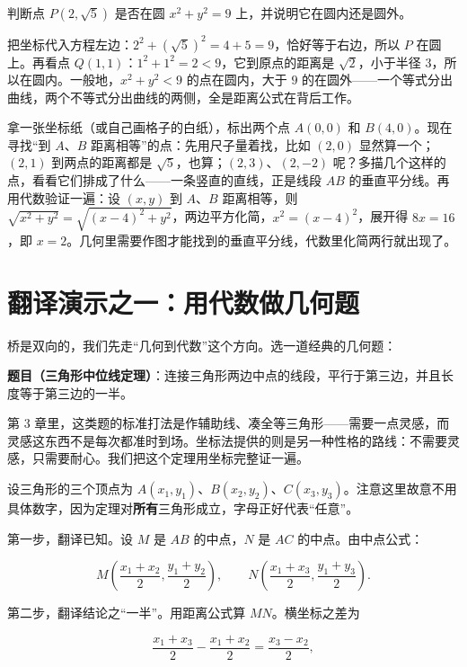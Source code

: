 \begin{li}
判断点 $P(2,\sqrt{5})$ 是否在圆 $x^{2}+y^{2}=9$ 上，并说明它在圆内还是圆外。

把坐标代入方程左边：$2^{2}+(\sqrt{5})^{2}=4+5=9$，恰好等于右边，所以 $P$ 在圆上。再看点 $Q(1,1)$：$1^{2}+1^{2}=2<9$，它到原点的距离是 $\sqrt{2}$，小于半径 $3$，所以在圆内。一般地，$x^{2}+y^{2}<9$ 的点在圆内，大于 $9$ 的在圆外——一个等式分出曲线，两个不等式分出曲线的两侧，全是距离公式在背后工作。
\end{li}

\begin{shiyan}
拿一张坐标纸（或自己画格子的白纸），标出两个点 $A(0,0)$ 和 $B(4,0)$。现在寻找“到 $A$、$B$ 距离相等”的点：先用尺子量着找，比如 $(2,0)$ 显然算一个；$(2,1)$ 到两点的距离都是 $\sqrt{5}$，也算；$(2,3)$、$(2,-2)$ 呢？多描几个这样的点，看看它们排成了什么——一条竖直的直线，正是线段 $AB$ 的垂直平分线。再用代数验证一遍：设 $(x,y)$ 到 $A$、$B$ 距离相等，则 $\sqrt{x^{2}+y^{2}}=\sqrt{(x-4)^{2}+y^{2}}$，两边平方化简，$x^{2}=(x-4)^{2}$，展开得 $8x=16$，即 $x=2$。几何里需要作图才能找到的垂直平分线，代数里化简两行就出现了。
\end{shiyan}

\section{翻译演示之一：用代数做几何题}

桥是双向的，我们先走“几何到代数”这个方向。选一道经典的几何题：

\textbf{题目（三角形中位线定理）}：连接三角形两边中点的线段，平行于第三边，并且长度等于第三边的一半。

第 3 章里，这类题的标准打法是作辅助线、凑全等三角形——需要一点灵感，而灵感这东西不是每次都准时到场。坐标法提供的则是另一种性格的路线：不需要灵感，只需要耐心。我们把这个定理用坐标完整证一遍。

设三角形的三个顶点为 $A(x_{1},y_{1})$、$B(x_{2},y_{2})$、$C(x_{3},y_{3})$。注意这里故意不用具体数字，因为定理对\textbf{所有}三角形成立，字母正好代表“任意”。

第一步，翻译已知。设 $M$ 是 $AB$ 的中点，$N$ 是 $AC$ 的中点。由中点公式：

\[
M\left(\frac{x_{1}+x_{2}}{2},\frac{y_{1}+y_{2}}{2}\right),\qquad
N\left(\frac{x_{1}+x_{3}}{2},\frac{y_{1}+y_{3}}{2}\right).
\]

第二步，翻译结论之“一半”。用距离公式算 $MN$。横坐标之差为

\[
\frac{x_{1}+x_{3}}{2}-\frac{x_{1}+x_{2}}{2}=\frac{x_{3}-x_{2}}{2},
\]


